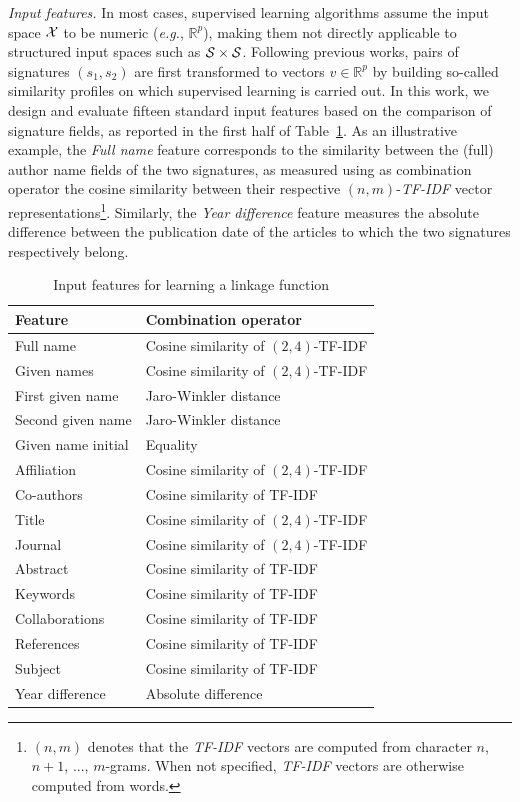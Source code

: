 \documentclass[conference]{IEEEtran}
\newcommand{\eg}{\emph{e.g.}\xspace}
\begin{document}
\textit{Input features.} In most cases, supervised learning algorithms assume
the input space ${\cal X}$ to be numeric (\eg, $\mathbb{R}^p$), making them
not directly applicable to structured input spaces such as ${\cal S} \times
{\cal S}$.
Following previous works, pairs of signatures $(s_1, s_2)$ are first transformed to vectors $v \in \mathbb{R}^p$
by building so-called similarity profiles \cite{treeratpituk2009disambiguating} on which supervised learning is carried out.
In this work, we design and evaluate fifteen standard input
features based on the comparison of signature fields, as reported in the first
half of Table~\ref{table:features}.
As an illustrative example, the \textit{Full name} feature corresponds to the similarity between the (full)
author name fields of the two signatures, as measured using as combination
operator the cosine similarity between their respective $(n,m)$-\emph{TF-IDF} vector
representations\footnote{$(n,m)$ denotes that the \emph{TF-IDF} vectors are computed
from character $n$, $n+1$, ..., $m$-grams.
When not specified, \emph{TF-IDF} vectors are otherwise computed from words.}.
Similarly, the \textit{Year difference} feature measures the absolute difference between the publication date of the
articles to which the two signatures respectively belong.

\begin{table}
\caption{Input features for learning a linkage function}
\label{table:features}
\centering
\begin{tabular}{|l|l|}
  \hline
  \textbf{Feature} & \textbf{Combination operator}\\
  \hline
  \hline
  Full name & Cosine similarity of $(2,4)$-TF-IDF\\
  Given names & Cosine similarity of $(2,4)$-TF-IDF\\
  First given name & Jaro-Winkler distance\\
  Second given name & Jaro-Winkler distance\\
  Given name initial & Equality\\
  Affiliation & Cosine similarity of $(2,4)$-TF-IDF\\
  Co-authors & Cosine similarity of TF-IDF\\
  Title & Cosine similarity of $(2,4)$-TF-IDF\\
  Journal & Cosine similarity of $(2,4)$-TF-IDF\\
  Abstract & Cosine similarity of TF-IDF\\
  Keywords & Cosine similarity of TF-IDF\\
  Collaborations & Cosine similarity of TF-IDF\\
  References & Cosine similarity of TF-IDF\\
  Subject & Cosine similarity of TF-IDF\\
  Year difference & Absolute difference\\
  \hline
\end{tabular}
\end{table}
\end{document}
